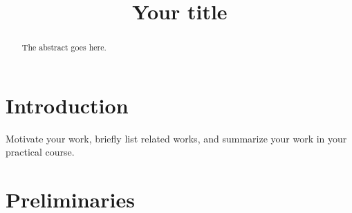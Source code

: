 \documentclass[conference]{IEEEtran}
\newcommand{\comment}[1]{{\color{tumblue} #1}}
\begin{document}


%
\title{Your title}


\author{
}





\maketitle

\begin{abstract}
\comment{The abstract goes here.}
 \lipsum[1]
\end{abstract}





%
\IEEEpeerreviewmaketitle


\section{Introduction}

\comment{Motivate your work, briefly list related works, and summarize your work in your practical course.}
\lipsum[1-4]

\section{Preliminaries}
\end{document}
